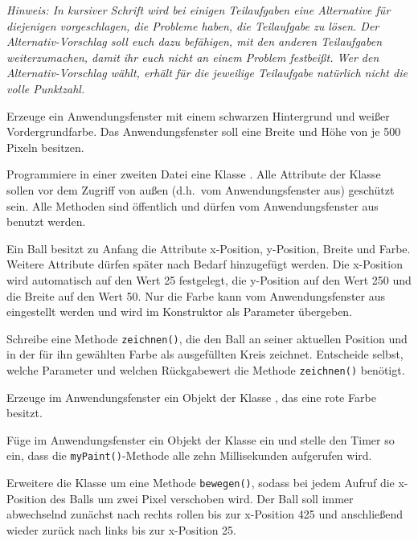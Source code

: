 \emph{Hinweis: In kursiver Schrift wird bei einigen Teilaufgaben eine
Alternative für diejenigen vorgeschlagen, die Probleme haben, die Teilaufgabe
zu lösen. Der Alternativ-Vorschlag soll euch dazu befähigen, mit den anderen
Teilaufgaben weiterzumachen, damit ihr euch nicht an einem Problem festbeißt.
Wer den Alternativ-Vorschlag wählt, erhält für die jeweilige Teilaufgabe
natürlich nicht die volle Punktzahl.}

\begin{compactenum}[a)]
\item Erzeuge ein Anwendungsfenster mit einem schwarzen Hintergrund und weißer
Vordergrundfarbe. Das Anwendungsfenster soll eine Breite und Höhe von je 500
Pixeln besitzen.

\item Programmiere in einer zweiten Datei eine Klasse . Alle
Attribute der Klasse  sollen vor dem Zugriff von außen (d.h.\ vom
Anwendungsfenster aus) geschützt sein. Alle Methoden sind öffentlich und dürfen
vom Anwendungsfenster aus benutzt werden.

Ein Ball besitzt zu Anfang die Attribute x-Position, y-Position, Breite und
Farbe. Weitere Attribute dürfen später nach Bedarf hinzugefügt werden. Die
x-Position wird automatisch auf den Wert 25 festgelegt, die y-Position auf den
Wert 250 und die Breite auf den Wert 50. Nur die Farbe kann vom
Anwendungsfenster aus eingestellt werden und wird im Konstruktor als Parameter
übergeben.

Schreibe eine Methode \lstinline|zeichnen()|, die den Ball an seiner aktuellen
Position und in der für ihn gewählten Farbe als ausgefüllten Kreis zeichnet.
Entscheide selbst, welche Parameter und welchen Rückgabewert die Methode
\lstinline|zeichnen()| benötigt.

\item Erzeuge im Anwendungsfenster ein Objekt der Klasse , das
eine rote Farbe besitzt.

\item Füge im Anwendungsfenster ein Objekt der Klasse  ein und
stelle den Timer so ein, dass die \lstinline|myPaint()|-Methode alle zehn
Millisekunden aufgerufen wird.

\item Erweitere die Klasse  um eine Methode \lstinline|bewegen()|,
sodass bei jedem Aufruf die x-Position des Balls um zwei Pixel
verschoben wird. Der Ball soll immer abwechselnd zunächst nach rechts rollen
bis zur x-Position 425 und anschließend wieder zurück nach links bis zur
x-Position 25.


\end{compactenum}
